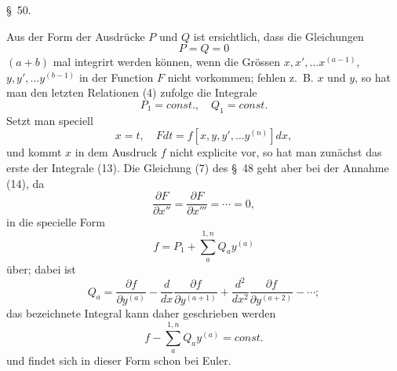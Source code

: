 \documentclass[11pt,a4paper,leqno]{article}
\begin{document}
\begin{center}
{\large \S~50.}
\end{center}

Aus der Form der Ausdrücke $P$ und $Q$ ist ersichtlich, dass die Gleichungen
\[
P=Q=0
\]
$(a+b)$ mal integrirt werden können, wenn die Grössen $x,x',\ldots x^{(a-1)}$, $y,y',\ldots y^{(b-1)}$ in der Function $F$ nicht vorkommen; fehlen z.~B. $x$ und $y$, so hat man den letzten Relationen (4) zufolge die Integrale
\begin{equation}\tag{13}
P_1=const.,\quad Q_1=const.
\end{equation}
Setzt man speciell
\begin{equation}\tag{14}
x=t,\quad Fdt=f[x,y,y',\ldots y^{(n)}]dx,
\end{equation}
und kommt $x$ in dem Ausdruck $f$ nicht explicite vor, so hat man zunächst das erste der Integrale (13). Die Gleichung (7) des \S~48 geht aber bei der Annahme (14), da
\[
\frac{\partial F}{\partial x''}=\frac{\partial F}{\partial x'''}=\cdots=0,
\]
in die specielle Form
\[
f=P_1+\sum_a^{1,n}Q_ay^{(a)}
\]
über; dabei ist
\[
Q_a=\frac{\partial f}{\partial y^{(a)}}-\frac{d}{dx}\frac{\partial f}{\partial y^{(a+1)}}+\frac{d^2}{dx^2}\frac{\partial f}{\partial y^{(a+2)}}-\cdots;
\]
das bezeichnete Integral kann daher geschrieben werden
\begin{equation}\tag{15}
f-\sum_a^{1,n}Q_ay^{(a)}=const.
\end{equation}
und findet sich in dieser Form schon bei Euler.
\end{document}
